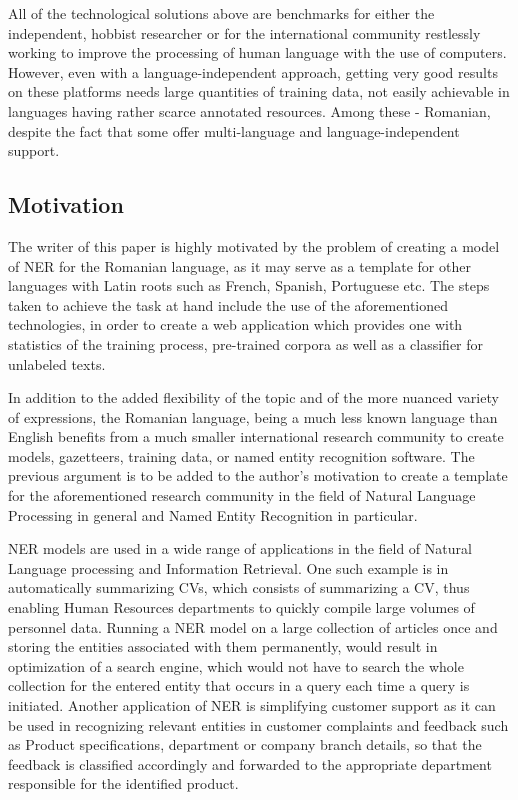 \documentclass[12pt,a4paper]{article}
\begin{document}
\qquad	All of the technological solutions above are benchmarks for either the independent, hobbist researcher or for the international community restlessly working to improve the processing of human language with the use of computers. However, even with a language-independent  approach, getting very good results on these platforms needs large quantities of training data, not easily achievable in languages having rather scarce annotated resources. Among these - Romanian, despite the fact that some offer multi-language and language-independent support.

\subsection{Motivation}

\qquad	\quad	The writer of this paper is highly motivated by the problem of creating a model of NER for the Romanian language, as it may serve as a template for other languages with Latin roots such as French, Spanish, Portuguese etc. The steps taken to achieve the task at hand include the use of the aforementioned technologies, in order to create a web application which provides one with statistics of the training process, pre-trained corpora as well as a classifier for unlabeled texts.	

\qquad In addition to the added flexibility of the topic and of the more nuanced variety of expressions, the Romanian language, being a much less known language than English benefits from a much smaller international research community to create models, gazetteers, training data, or named entity recognition software. The previous argument is to be added to the author's motivation to create a template for the aforementioned research community in the field of Natural Language Processing in general and Named Entity Recognition in particular.

\qquad NER models are used in a wide range of applications in the field of Natural Language processing and Information Retrieval. One such example is in automatically summarizing CVs, which consists of summarizing a CV, thus enabling Human Resources departments to quickly compile large volumes of personnel data. Running a NER model on a large collection of articles once and storing the entities associated with them permanently, would result in optimization of a search engine, which would not have to search the whole collection for the entered entity that occurs in a query each time a query is initiated. Another application of NER is simplifying customer support as it can be used in recognizing relevant entities in customer complaints and feedback such as Product specifications, department or company branch details, so that the feedback is classified accordingly and forwarded to the appropriate department responsible for the identified product.
\end{document}
